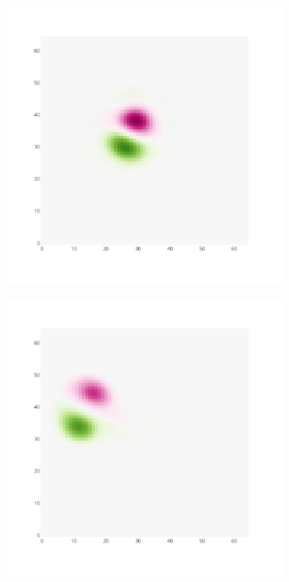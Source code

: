 \begin{figure}[htbp]
    \begin{subfigure}{0.32\textwidth}
        \includegraphics[width=\linewidth]{images/app2d/best_estimate_2.pdf}
    \end{subfigure}
    \hfill
    \begin{subfigure}{0.32\textwidth}
        \includegraphics[width=\linewidth]{images/app2d/best_estimate_10.pdf}

\end{subfigure}
\end{figure}
